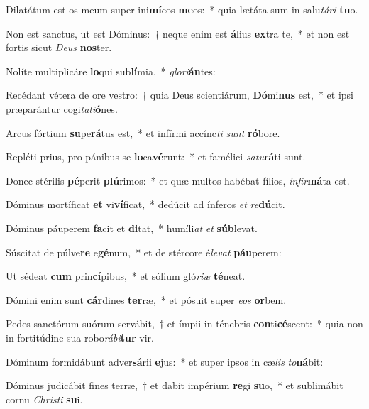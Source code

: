 \item Dilatátum est os meum super ini\textbf{mí}cos \textbf{me}os:~* quia lætáta sum in salu\textit{tá}\textit{ri} \textbf{tu}o.
\item Non est sanctus, ut est Dóminus:~† neque enim est \textbf{á}lius \textbf{ex}tra te,~* et non est fortis sicut \textit{De}\textit{us} \textbf{nos}ter.
\item Nolíte multiplicáre \textbf{lo}qui sub\textbf{lí}mia,~* \textit{glo}\textit{ri}\textbf{án}tes:
\item Recédant vétera de ore vestro:~† quia Deus scientiárum, \textbf{Dó}mi\textbf{nus} est,~* et ipsi præparántur cogi\textit{ta}\textit{ti}\textbf{ó}nes.
\item Arcus fórtium \textbf{su}pe\textbf{rá}tus est,~* et infírmi accínc\textit{ti} \textit{sunt} \textbf{ró}bore.
\item Repléti prius, pro pánibus se \textbf{lo}ca\textbf{vé}runt:~* et famélici \textit{sa}\textit{tu}\textbf{rá}ti sunt.
\item Donec stérilis \textbf{pé}perit \textbf{plú}rimos:~* et quæ multos habébat fílios, \textit{in}\textit{fir}\textbf{má}ta est.
\item Dóminus mortíficat \textbf{et} vi\textbf{ví}ficat,~* dedúcit ad ínferos \textit{et} \textit{re}\textbf{dú}cit.
\item Dóminus páuperem \textbf{fa}cit et \textbf{di}tat,~* humíli\textit{at} \textit{et} \textbf{súb}levat.
\item Súscitat de púlve\textbf{re} e\textbf{gé}num,~* et de stércore é\textit{le}\textit{vat} \textbf{páu}perem:
\item Ut sédeat \textbf{cum} prin\textbf{cí}pibus,~* et sólium gló\textit{ri}\textit{æ} \textbf{té}neat.
\item Dómini enim sunt \textbf{cár}dines \textbf{ter}ræ,~* et pósuit super \textit{e}\textit{os} \textbf{or}bem.
\item Pedes sanctórum suórum servábit,~† et ímpii in ténebris \textbf{con}ti\textbf{cé}scent:~* quia non in fortitúdine sua robo\textit{rá}\textit{bi}\textbf{tur} vir.
\item Dóminum formidábunt adver\textbf{sá}rii \textbf{e}jus:~* et super ipsos in cæ\textit{lis} \textit{to}\textbf{ná}bit:
\item Dóminus judicábit fines terræ,~† et dabit impérium \textbf{re}gi \textbf{su}o,~* et sublimábit cornu \textit{Chris}\textit{ti} \textbf{su}i.
